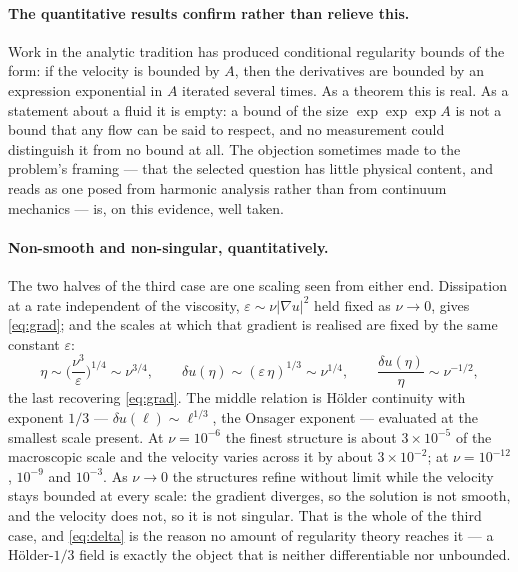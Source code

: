 \documentclass[11pt]{article}
\newcommand{\grad}{\nabla}
\newcommand{\eps}{\varepsilon}
\begin{document}
\paragraph{The quantitative results confirm rather than relieve this.} Work in the analytic
tradition has produced conditional regularity bounds of the form: if the velocity is bounded by $A$,
then the derivatives are bounded by an expression exponential in $A$ iterated several times. As a
theorem this is real. As a statement about a fluid it is empty: a bound of the size
$\exp\exp\exp A$ is not a bound that any flow can be said to respect, and no measurement could
distinguish it from no bound at all. The objection sometimes made to the
problem's framing --- that the selected question has little physical content, and reads as one posed
from harmonic analysis rather than from continuum mechanics --- is, on this evidence, well taken.

\paragraph{Non-smooth and non-singular, quantitatively.} The two halves of the third case are one
scaling seen from either end. Dissipation at a rate independent of the viscosity,
$\eps\sim\nu|\grad u|^2$ held fixed as $\nu\to0$, gives \eqref{eq:grad}; and the scales at which
that gradient is realised are fixed by the same constant $\eps$:
\begin{equation}\label{eq:delta}
\eta \sim \Big(\frac{\nu^3}{\eps}\Big)^{1/4} \sim \nu^{3/4},
\qquad
\delta u(\eta) \sim (\eps\,\eta)^{1/3} \sim \nu^{1/4},
\qquad
\frac{\delta u(\eta)}{\eta} \sim \nu^{-1/2},
\end{equation}
the last recovering \eqref{eq:grad}. The middle relation is H\"older continuity with exponent
$1/3$ --- $\delta u(\ell)\sim\ell^{1/3}$, the Onsager exponent --- evaluated at the smallest scale
present. At $\nu=10^{-6}$ the finest structure is about $3\times10^{-5}$ of the macroscopic scale
and the velocity varies across it by about $3\times10^{-2}$; at $\nu=10^{-12}$, $10^{-9}$ and
$10^{-3}$. As $\nu\to0$ the structures refine without limit while the velocity stays bounded at
every scale: the gradient diverges, so the solution is not smooth, and the velocity does not, so it
is not singular. That is the whole of the third case, and \eqref{eq:delta} is the reason no amount
of regularity theory reaches it --- a H\"older-$1/3$ field is exactly the object that is neither
differentiable nor unbounded.
\end{document}

